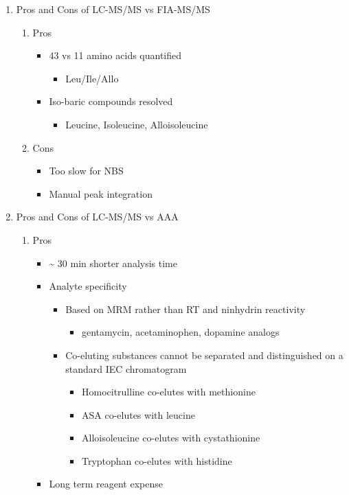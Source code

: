 \documentclass{scrartcl}
\begin{document}
\begin{enumerate}
\item Pros and Cons of LC-MS/MS vs FIA-MS/MS
\label{sec:orgc01e561}
\begin{enumerate}
\item Pros
\label{sec:org3310797}
\begin{itemize}
\item 43 vs 11 amino acids quantified
\begin{itemize}
\item Leu/Ile/Allo
\end{itemize}
\item Iso-baric compounds resolved
\begin{itemize}
\item Leucine, Isoleucine, Alloisoleucine
\end{itemize}
\end{itemize}
\item Cons
\label{sec:orgae052fb}
\begin{itemize}
\item Too slow for NBS
\item Manual peak integration
\end{itemize}
\end{enumerate}
\item Pros and Cons of LC-MS/MS vs AAA
\label{sec:org314adc4}
\begin{enumerate}
\item Pros
\label{sec:org092fbb1}
\begin{itemize}
\item \textasciitilde{} 30 min shorter analysis time
\item Analyte specificity
\begin{itemize}
\item Based on MRM rather than RT and ninhydrin reactivity
\begin{itemize}
\item gentamycin, acetaminophen, dopamine analogs
\end{itemize}
\item Co-eluting substances cannot be separated and distinguished on a
standard IEC chromatogram
\begin{itemize}
\item Homocitrulline co-elutes with methionine
\item ASA co-elutes with leucine
\item Alloisoleucine co-elutes with cystathionine
\item Tryptophan co-elutes with histidine
\end{itemize}
\end{itemize}
\item Long term reagent expense
\end{itemize}


\end{enumerate}
\end{enumerate}
\end{document}
